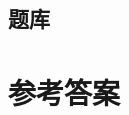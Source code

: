 \begin{center}
\section*{题库}
\end{center}

\begin{enumerate}
\foreachproblem{\item\label{prob:\thisproblemlabel}\thisproblem}
\end{enumerate}

\newpage
\showanswers
\section*{参考答案}
\begin{itemize}
\end{itemize}